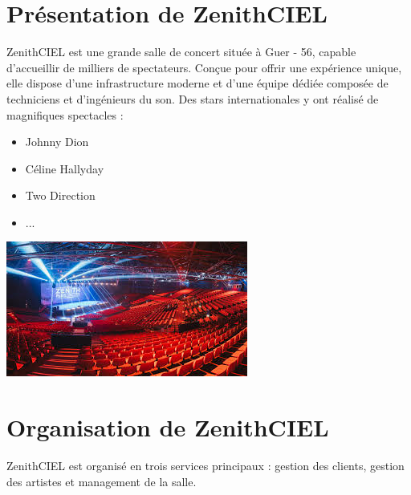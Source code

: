 \documentclass[french, 12pt]{article}%
\newcommand{\itemE}{\item[$\bullet$]}
\begin{document}
\vspace{0.25cm}

\section{Présentation de ZenithCIEL}
ZenithCIEL est une grande salle de concert située à Guer - 56, capable d'accueillir de milliers de spectateurs. Conçue pour offrir une expérience unique, elle dispose d'une infrastructure moderne et d'une équipe dédiée composée de techniciens et d'ingénieurs du son. Des stars internationales y ont réalisé de magnifiques spectacles : 

\begin{minipage}{0.4\linewidth}
\begin{itemize}
\itemE Johnny Dion
\itemE Céline Hallyday
\itemE Two Direction
\itemE...
\end{itemize}
\end{minipage}
\begin{minipage}{0.6\linewidth}
\begin{center}
\includegraphics[scale=0.6]{./ressource/salleConcert.png}
\end{center}
\end{minipage}

\section{Organisation de ZenithCIEL}
ZenithCIEL est organisé en trois services principaux : gestion des clients, gestion des artistes et management de la salle.
\end{document}
